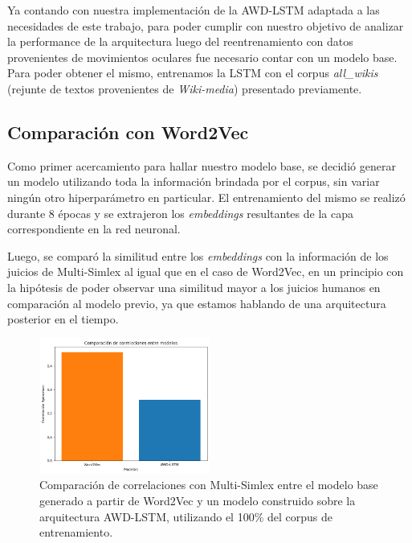 \label{sec:modelo_base}

Ya contando con nuestra implementación de la AWD-LSTM adaptada a las necesidades de este 
trabajo, para poder cumplir con nuestro objetivo de analizar la performance de la 
arquitectura luego del reentrenamiento con datos provenientes de movimientos oculares 
fue necesario contar con un modelo base.
Para poder obtener el mismo, entrenamos la LSTM con el corpus \textit{all\_wikis} (rejunte de textos 
provenientes de \textit{Wiki-media}) presentado previamente.

\subsection{Comparación con Word2Vec}

Como primer acercamiento para hallar nuestro modelo base, se decidió generar un modelo 
utilizando toda la información brindada por el corpus, sin variar ningún otro hiperparámetro 
en particular. El entrenamiento del mismo se realizó durante 8 épocas y se extrajeron los 
\textit{embeddings} resultantes de la capa correspondiente en la red neuronal.

Luego, se comparó la similitud entre los \textit{embeddings} con la información de los juicios de 
Multi-Simlex al igual que en el caso de Word2Vec, en un principio con la hipótesis de 
poder observar una similitud mayor a los juicios humanos en comparación al modelo previo, 
ya que estamos hablando de una arquitectura posterior en el tiempo.


\begin{figure}[htb]
    \centering
    \includegraphics[width=0.5\textwidth]{imagenes/comparacion_w2v_lstm.png}
    \caption{Comparación de correlaciones con Multi-Simlex entre el modelo base 
    generado a partir de Word2Vec y un modelo construido sobre la arquitectura AWD-LSTM, 
    utilizando el 100\% del corpus de entrenamiento.}
    \label{fig:comparacion_w2v_lstm}
\end{figure}

